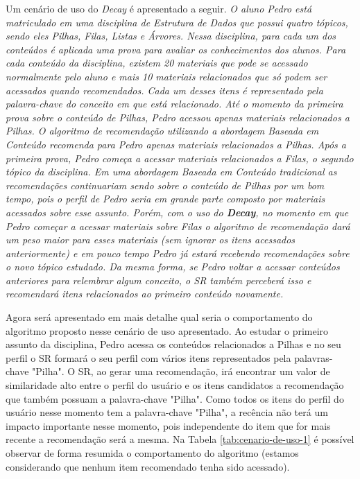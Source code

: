 Um cenário de uso do \textit{Decay} é apresentado a seguir. \textit{O aluno Pedro está matriculado em uma disciplina de Estrutura de Dados
que possui quatro tópicos, sendo eles Pilhas, Filas, Listas e Árvores. Nessa disciplina, para cada um dos conteúdos é
aplicada uma prova para avaliar os conhecimentos dos alunos. Para cada conteúdo da disciplina, existem 20 materiais que pode
se acessado normalmente pelo aluno e mais 10 materiais relacionados que só podem ser acessados quando recomendados.
Cada um desses itens é representado pela palavra-chave do conceito em que está relacionado. Até o momento da primeira prova sobre o conteúdo de Pilhas,
Pedro acessou apenas materiais relacionados a Pilhas. O algoritmo de recomendação utilizando a abordagem Baseada em
Conteúdo recomenda para Pedro apenas materiais relacionados a Pilhas. Após a primeira prova, Pedro começa a acessar
materiais relacionados a Filas, o segundo tópico da disciplina. Em uma abordagem Baseada em Conteúdo tradicional as
recomendações continuariam sendo sobre o conteúdo de Pilhas por um bom tempo, pois o perfil de Pedro seria em grande
parte composto por materiais acessados sobre esse assunto. Porém, com o uso do \textbf{Decay}, no momento em que Pedro começar a
acessar materiais sobre Filas o algoritmo de recomendação dará um peso maior para esses materiais (sem ignorar os itens
acessados anteriormente) e em pouco tempo Pedro já estará recebendo recomendações sobre o novo tópico estudado. Da mesma
forma, se Pedro voltar a acessar conteúdos anteriores para relembrar algum conceito, o SR também perceberá isso e
recomendará itens relacionados ao primeiro conteúdo novamente.}

Agora será apresentado em mais detalhe qual seria o comportamento do algoritmo proposto nesse cenário de uso apresentado.
Ao estudar o primeiro assunto da disciplina, Pedro acessa os conteúdos relacionados a Pilhas e no seu perfil
o SR formará o seu perfil com vários itens representados pela palavras-chave "Pilha". O SR, ao gerar uma recomendação,
irá encontrar um valor de similaridade alto entre o perfil do usuário e os itens candidatos a recomendação que também possuam
a palavra-chave "Pilha". Como todos os itens do perfil do usuário nesse momento tem a palavra-chave "Pilha", a recência não
terá um impacto importante nesse momento, pois independente do item que for mais recente a recomendação será a mesma. Na
Tabela \ref{tab:cenario-de-uso-1} é possível observar de forma resumida o comportamento do algoritmo (estamos considerando
que nenhum item recomendado tenha sido acessado).

